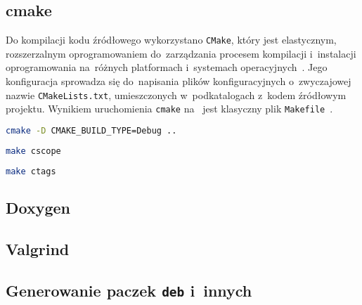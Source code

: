 \documentclass[thesis]{subfiles}
\begin{document}

\subsection{cmake}

Do kompilacji kodu źródłowego wykorzystano \texttt{CMake}, który jest elastycznym, rozszerzalnym oprogramowaniem do~zarządzania procesem kompilacji i~instalacji oprogramowania na~różnych platformach i~systemach operacyjnych~\cite{cmake}. Jego konfiguracja sprowadza się do~napisania plików konfiguracyjnych o~zwyczajowej nazwie \mbox{\texttt{CMakeLists.txt}}, umieszczonych w~podkatalogach z~kodem źródłowym projektu. Wynikiem uruchomienia \texttt{cmake} na~ jest klasyczny plik \texttt{Makefile}~\cite{gnu-makefile-manual}.

\begin{lstlisting}[language=bash,numbers=none,caption={Uruchomienie \texttt{cmake} w~trybie \texttt{Debug}}]
cmake -D CMAKE_BUILD_TYPE=Debug ..
\end{lstlisting}

\begin{lstlisting}[language=bash,numbers=none,caption={Generowanie symboli dla \texttt{cscope}}]
make cscope
\end{lstlisting}

\begin{lstlisting}[language=bash,numbers=none,caption={Generowanie symboli dla \texttt{ctags}}]
make ctags
\end{lstlisting}


\subsection{Doxygen}


\subsection{Valgrind}


\subsection{Generowanie paczek \texttt{deb} i~innych}
\end{document}

